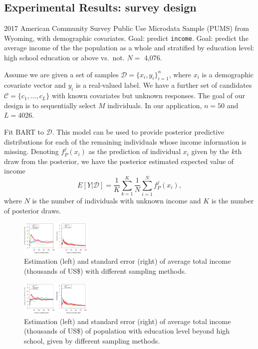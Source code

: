 \documentclass[a0,portrait]{a0poster}
\begin{document}
\begin{multicols}{3}
\section*{Experimental Results: survey design}
2017 American Community Survey Public Use Microdata Sample (PUMS) from Wyoming, with demographic covariates. Goal: predict \texttt{income}. Goal: predict the average income of the the population as a whole and stratified by education level: high school education or above vs.~not. $N = $ 4,076. 

Assume we are given a set of samples $\mathcal{D} = \{x_i,y_i\}_{i=1}^n$, where $x_i$ is a demographic covariate vector and $y_i$ is a real-valued label. We have a further set of candidates $\mathcal{C} = \{c_1, \ldots, c_L\}$ with known covariates but unknown responses. The goal of our design is to sequentially select $M$ individuals.  In our application, $n = 50$ and $L = 4026$.

Fit BART to $\mathcal{D}$. This model can be used to provide posterior predictive distributions for each of the remaining individuals whose income information is missing. Denoting $f_P^j(x_i)$ as the prediction of individual $x_i$ given by the $k$th  draw from the posterior, we have the posterior estimated expected value of income 
\begin{equation}
\label{eq:mean}
    E[Y|\mathcal{D}] = \frac{1}{K}\sum_{k=1}^K\frac{1}{N}\sum_{i=1}^N f_P^j(x_i),
\end{equation}
where $N$ is the number of individuals with unknown income and $K$ is the number of posterior draws.

\begin{figure}[H]
    \centering
	\includegraphics[width = 0.30\textwidth]{figures/population.png}
    \caption{Estimation (left) and standard error (right) of average total income (thousands of US\$) with different sampling methods.}

\end{figure}
\begin{figure}[H]
    \centering
	\includegraphics[width = 0.30\textwidth]{figures/high.png}
    \caption{Estimation (left) and standard error (right) of average total income (thousands of US\$) of population with education level beyond high school, given by different sampling methods.}



\end{figure}
\end{multicols}
\end{document}
